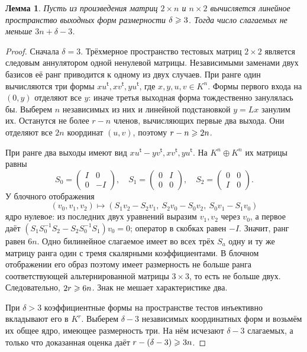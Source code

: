 \documentclass[11pt,a4paper]{article}
\numberwithin{equation}{section}
\theoremstyle{plain}
\newtheorem{lemma}[theorem]{Лемма}
\theoremstyle{definition}
\begin{document}
\begin{lemma}\label{lem:partial}
Пусть из произведения матриц $2\times n$ и $n\times2$ вычисляется
линейное пространство выходных форм размерности $\delta\geqslant3$.
Тогда число слагаемых не меньше $3n+\delta-3$.
\end{lemma}
\begin{proof}
Сначала $\delta=3$. Трёхмерное пространство тестовых матриц $2\times2$
является следовым аннулятором одной ненулевой матрицы. Независимыми
заменами двух базисов её ранг приводится к одному из двух случаев.
При ранге один вычисляются три формы
$x u^{\mathsf t},x v^{\mathsf t},y u^{\mathsf t}$, где $x,y,u,v\in K^n$.
Формы первого входа на $(0,y)$ отделяют все $y$: иначе третья выходная
форма тождественно занулялась бы. Выберем $n$ независимых из них и
линейной подстановкой $y=Lx$ занулим их. Останутся не более $r-n$
членов, вычисляющих первые два выхода. Они отделяют все $2n$ координат
$(u,v)$, поэтому $r-n\geqslant2n$.

При ранге два выходы имеют вид
$x u^{\mathsf t}-y v^{\mathsf t},x v^{\mathsf t},y u^{\mathsf t}$.
На $K^n\oplus K^n$ их матрицы равны
\[
 S_0=\begin{pmatrix}I&0\\0&-I\end{pmatrix},\quad
 S_1=\begin{pmatrix}0&I\\0&0\end{pmatrix},\quad
 S_2=\begin{pmatrix}0&0\\I&0\end{pmatrix}.
\]
У блочного отображения
\[
 (v_0,v_1,v_2)\longmapsto
 (S_1v_2-S_2v_1,\ S_2v_0-S_0v_2,\ S_0v_1-S_1v_0)
\]
ядро нулевое: из последних двух уравнений выразим $v_1,v_2$ через
$v_0$, а первое даёт
$(S_1S_0^{-1}S_2-S_2S_0^{-1}S_1)v_0=0$; оператор в скобках равен
$-I$. Значит, ранг равен $6n$. Одно билинейное слагаемое имеет
во всех трёх $S_a$ одну и ту же матрицу ранга один с тремя скалярными
коэффициентами. В блочном отображении его образ поэтому имеет размерность
не больше ранга соответствующей альтернированной матрицы $3\times3$,
то есть не больше двух. Следовательно, $2r\geqslant6n$.
Знак не мешает характеристике два.

При $\delta>3$ коэффициентные формы на пространстве тестов инъективно
вкладывают его в $K^r$. Выберем $\delta-3$ независимых координатных
форм и возьмём их общее ядро, имеющее размерность три. На нём исчезают
$\delta-3$ слагаемых, а только что доказанная оценка даёт
$r-(\delta-3)\geqslant3n$.
\end{proof}
\end{document}
